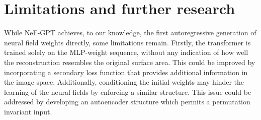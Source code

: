 \section{Limitations and further research}

While NeF-GPT achieves, to our knowledge, the first autoregressive generation of neural field weights directly, some limitations remain. Firstly, the transformer is trained solely on the MLP-weight sequence, without any indication of how well the reconstruction resembles the original surface area. This could be improved by incorporating a secondary loss function that provides additional information in the image space. Additionally, conditioning the initial weights may hinder the learning of the neural fields by enforcing a similar structure. This issue could be addressed by developing an autoencoder structure which permits a permutation invariant input.